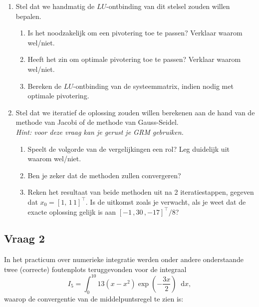 \documentclass[kulak]{kulakarticle}
\newcommand*\diff{\mathop{}\!\mathrm{d}}
\begin{document}
	\begin{enumerate}

		\item Stel dat we handmatig de \(LU\)-ontbinding van dit stelsel zouden willen bepalen.
		\begin{enumerate}
			\item Is het noodzakelijk om een pivotering toe te passen? Verklaar waarom wel/niet.
			\item Heeft het zin om optimale pivotering toe te passen? Verklaar waarom wel/niet.
			\item Bereken de \(LU\)-ontbinding van de systeemmatrix, indien nodig met optimale pivotering.
		\end{enumerate}

		\item Stel dat we iteratief de oplossing zouden willen berekenen aan de hand van de methode van Jacobi of de methode van Gauss-Seidel.\\\textit{Hint: voor deze vraag kan je gerust je GRM gebruiken.}
		\begin{enumerate}
			\item Speelt de volgorde van de vergelijkingen een rol? Leg duidelijk uit waarom wel/niet.
			\item Ben je zeker dat de methoden zullen convergeren?
			\item Reken het resultaat van beide methoden uit na 2 iteratiestappen, gegeven dat \(x_0 = [1, \, 1 \, 1]^\top\). Is de uitkomst zoals je verwacht, als je weet dat de exacte oplossing gelijk is aan \([-1 \,, 30 \,, -17]^\top /8\)?
		\end{enumerate}

	\end{enumerate}

	\newpage

	\subsection*{Vraag 2}

	In het practicum over numerieke integratie werden onder andere onderstaande twee (correcte) foutenplots teruggevonden voor de integraal \[I_5 = \int_{0}^{10} 13(x-x^2)\exp\left(-\frac{3x}{2}\right) \diff x,\]waarop de convergentie van de middelpuntsregel te zien is:
\end{document}

